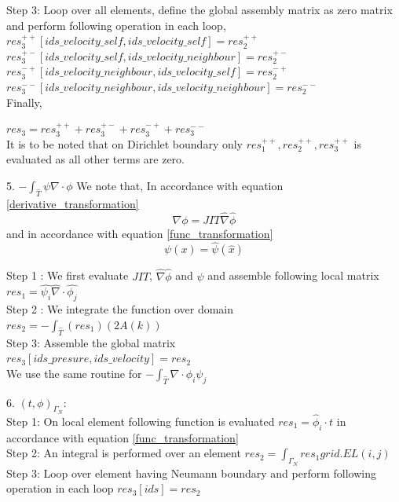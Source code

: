 \documentclass[a4paper,12pt]{book}
\begin{document}
Step 3: Loop over all elements, define the global assembly matrix as zero matrix and perform following operation in each loop,
\\
$res_3^{++}[ids\_velocity\_self,ids\_velocity\_self] = res_2^{++}$\\
$res_3^{+-}[ids\_velocity\_self,ids\_velocity\_neighbour] = res_2^{+-}$\\
$res_3^{-+}[ids\_velocity\_neighbour,ids\_velocity\_self] = res_2^{-+}$\\
$res_3^{--}[ids\_velocity\_neighbour,ids\_velocity\_neighbour] = res_2^{--}$\\

Finally,

$res_3 = res_3^{++} + res_3^{+-} + res_3^{-+} + res_3^{--}$\\

It is to be noted that on Dirichlet boundary only $res_1^{++}, res_2^{++}, res_3^{++}$ is evaluated as all other terms are zero.

5. $-\int_{\hat{T}} \psi \nabla \cdot \phi$
We note that, In accordance with equation \ref{derivative_transformation}
\begin{equation}
\nabla \phi = JIT \hat{\nabla} \hat{\phi}
\end{equation}
and in accordance with equation \ref{func_transformation}
\begin{equation}
\psi(x) = \hat{\psi} (\hat{x})
\end{equation}

Step 1 : We first evaluate $JIT$, $\hat{\nabla} \hat{\phi}$ and $\psi$ and assemble following local matrix\\
$res_1 = \hat{\psi_i} \hat{\nabla} \cdot \hat{\phi_j}$\\

Step 2 : We integrate the function over domain\\
$res_2 = -\int_{\hat{T}} (res_1) (2 A(k))$\\

Step 3: Assemble the global matrix\\
$res_3[ids\_presure,ids\_velocity] = res_2$\\

We use the same routine for $-\int_{\hat{T}} \nabla \cdot \phi_i \psi_j $

6. $(t,\phi)_{\Gamma_N}$:
\\

Step 1: On local element following function is evaluated $res_1=\hat{\phi}_i \cdot t$ in accordance with equation  \ref{func_transformation}\\
Step 2: An integral is performed over an element $res_2=\int_{\Gamma_N} res_1 grid.EL(i,j) $\\
Step 3: Loop over element having Neumann boundary and perform following operation in each loop $res_3[ids]=res_2$\\
\end{document}
